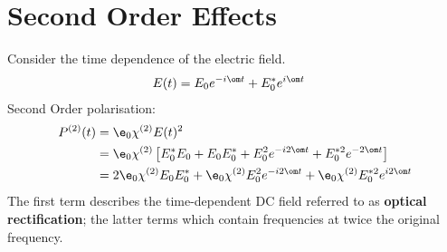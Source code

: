 \documentclass[a4paper, 11pt, normalem]{report}
\begin{document}
\section{Second Order Effects}
\begin{figure}[H]
    \centering
\end{figure}
Consider the time dependence of the electric field. 
\begin{align}
    E(t) &= E_0e^{-i\om t} + E_0^*e^{i\om t}
\end{align}
Second Order polarisation:
\begin{align}
    P^{(2)}(t) &= \e_0\chi^{(2)}E(t)^2 \\
               &= \e_0\chi^{(2)}\left[E_0^*E_0 + E_0E_0^* + E_0^2e^{-i2\om t} + E_0^{*2}e^{-2\om t}\right] \\
               &= 2\e_0\chi^{(2)}E_0E_0^* + \e_0\chi^{(2)}E_0^2e^{-i2\om t} + \e_0\chi^{(2)}E_0^{*2}e^{i2\om t}
\end{align}
The first term describes the time-dependent DC field referred to as \textbf{optical rectification}; the latter terms which contain frequencies at twice the original frequency. 
\end{document}
